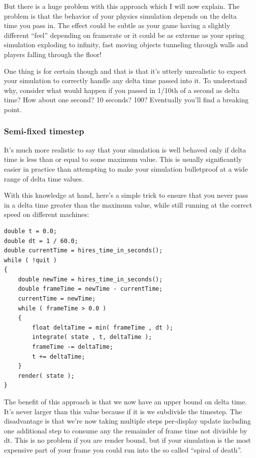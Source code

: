 \documentclass[12pt]{article}
\begin{document}
But there is a huge problem with this approach which I will now explain. The problem is that the behavior of your physics simulation depends on the delta time you pass in. The effect could be subtle as your game having a slightly different ``feel'' depending on framerate or it could be as extreme as your spring simulation exploding to infinity, fast moving objects tunneling through walls and players falling through the floor!

One thing is for certain though and that is that it's utterly unrealistic to expect your simulation to correctly handle any delta time passed into it. To understand why, consider what would happen if you passed in 1/10th of a second as delta time? How about one second? 10 seconds? 100? Eventually you'll find a breaking point. 

\subsubsection*{Semi-fixed timestep}

It's much more realistic to say that your simulation is well behaved only if delta time is less than or equal to some maximum value. This is usually significantly easier in practice than attempting to make your simulation bulletproof at a wide range of delta time values. 

With this knowledge at hand, here's a simple trick to ensure that you never pass in a delta time greater than the maximum value, while still running at the correct speed on different machines:

\begin{minipage}{\linewidth}\begin{lstlisting}
double t = 0.0;
double dt = 1 / 60.0;
double currentTime = hires_time_in_seconds();
while ( !quit )
{
	double newTime = hires_time_in_seconds();
	double frameTime = newTime - currentTime;
	currentTime = newTime;
	while ( frameTime > 0.0 )
	{
		float deltaTime = min( frameTime , dt );
		integrate( state , t, deltaTime );
		frameTime -= deltaTime;
		t += deltaTime;
	}
	render( state );
}
\end{lstlisting}\end{minipage}

The benefit of this approach is that we now have an upper bound on delta time. It's never larger than this value because if it is we subdivide the timestep. The disadvantage is that we're now taking multiple steps per-display update including one additional step to consume any the remainder of frame time not divisible by dt. This is no problem if you are render bound, but if your simulation is the most expensive part of your frame you could run into the so called ``spiral of death''.
\end{document}
